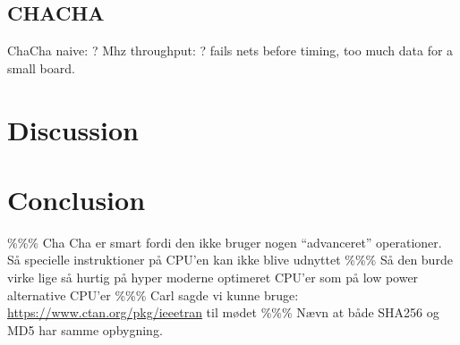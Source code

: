 \documentclass[a4paper]{article}
\begin{document}
\subsection{CHACHA}
\label{sec:org7edb6f4}
ChaCha naive: ? Mhz
throughput: ?
fails nets before timing, too much data for a small board.

\section{Discussion}
\label{sec:org5b4590b}

\section{Conclusion}
\label{sec:orgb701c70}




\begin{appendix}

\end{appendix}
\%\%\% Cha Cha er smart fordi den ikke bruger nogen ``advanceret'' operationer. Så specielle instruktioner på CPU'en kan ikke blive udnyttet
\%\%\% Så den burde virke lige så hurtig på hyper moderne optimeret CPU'er som på low power alternative CPU'er
\%\%\% Carl sagde vi kunne bruge: \url{https://www.ctan.org/pkg/ieeetran} til mødet
\%\%\% Nævn at både SHA256 og MD5 har samme opbygning.
\end{document}
